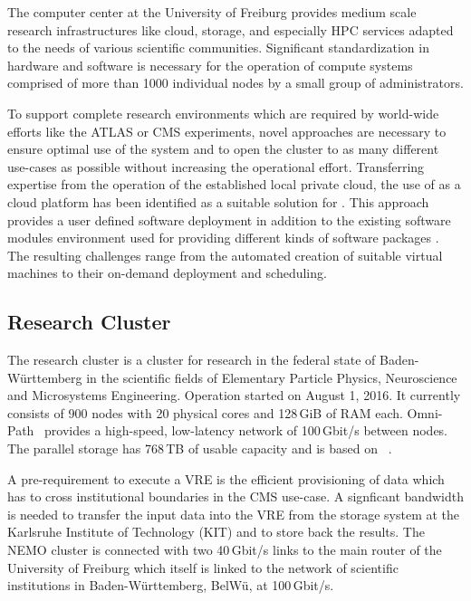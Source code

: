 The computer center at the University of Freiburg provides
medium scale research
infrastructures like cloud, storage, and especially HPC services adapted to the
needs of various scientific communities. Significant standardization
in hardware and software is necessary for the operation of compute systems comprised of
more than 1000 individual nodes by a small group of administrators.

To support complete research environments which are required by world-wide efforts like the
ATLAS or CMS experiments, novel approaches are necessary to ensure optimal use of the system
and to open the cluster to as many different use-cases as
possible without increasing the operational effort.
Transferring expertise from the operation of the established local
private cloud, 
the use of \Openstack as a cloud platform has been identified
as a
suitable solution for \NEMO. This approach provides a user defined software
deployment in addition to the existing software  modules environment used for
providing different kinds of software packages \cite{online:modules}.
The resulting challenges range from the automated creation of suitable
virtual machines to their on-demand deployment and scheduling.

\subsection{Research Cluster \NEMO}

The research cluster \NEMO is a cluster for 
research in the federal state of Baden-W\"urttemberg in the scientific fields of Elementary Particle Physics, Neuroscience and
Microsystems Engineering. Operation started on  August 1, 2016.
It currently consists of 900 nodes with 20 physical cores and 128\,GiB of RAM each.
Omni-Path~\cite{Omnipath} provides a high-speed, low-latency network of 100\,Gbit/s between nodes.
The parallel storage has
768\,TB of usable capacity and is based on \BeeGFS~\cite{BeeGFS}.


A pre-requirement to execute a VRE is the efficient
provisioning of data which has to cross institutional boundaries in the CMS use-case.
A signficant bandwidth is needed to transfer the input data into the VRE from the storage system at
the Karlsruhe Institute of Technology (KIT) and to store back the results. The
NEMO cluster is connected with two 40\,Gbit/s links to the main router of the
University of Freiburg which itself is linked to the network of
scientific institutions in Baden-W\"urttemberg, BelW\"u, at
100\,Gbit/s.

